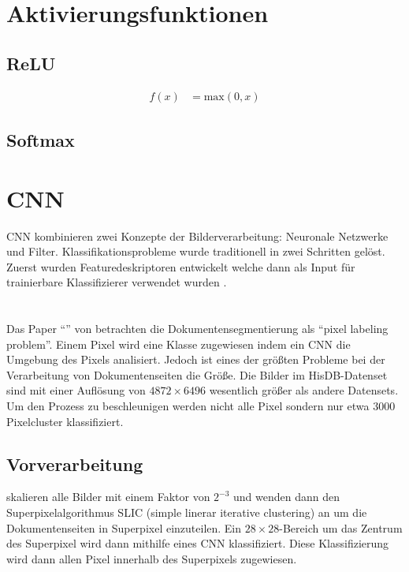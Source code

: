 \section{Aktivierungsfunktionen}
\subsection{ReLU}
\begin{align}
    f\left(x\right) &= \text{max}(0,x)
\end{align}
\subsection{Softmax}


\section{CNN}
CNN kombinieren zwei Konzepte der Bilderverarbeitung: Neuronale Netzwerke und Filter.
Klassifikationsprobleme wurde traditionell in zwei Schritten gelöst. Zuerst wurden 
Featuredeskriptoren entwickelt welche dann als Input für trainierbare Klassifizierer 
verwendet wurden \autocite[2353]{RawatDeepConvolutionalNeural2017}.

\qq{}

\section{\textcite{ChenConvolutionalNeuralNetworks2017}}
Das Paper ``'' von \citeauthor*{ChenConvolutionalNeuralNetworks2017} betrachten die Dokumentensegmentierung 
als ``pixel labeling problem''. Einem Pixel wird eine Klasse zugewiesen indem
ein CNN die Umgebung des Pixels analisiert. 
Jedoch ist eines der größten Probleme bei der Verarbeitung von Dokumentenseiten die Größe.
Die Bilder im HisDB-Datenset sind mit einer Auflösung von \(4872 \times 6496\) wesentlich größer als andere Datensets.
Um den Prozess zu beschleunigen werden nicht alle Pixel sondern nur etwa 3000 Pixelcluster klassifiziert. 

\subsection{Vorverarbeitung}
\citeauthor{ChenConvolutionalNeuralNetworks2017} skalieren alle Bilder mit einem Faktor von  \(2^{-3}\) und wenden dann den Superpixelalgorithmus SLIC (simple linerar iterative clustering) an \parencite{AchantaSLICSuperpixels2010} um die Dokumentenseiten in Superpixel einzuteilen.
Ein \(28 \times 28\)-Bereich um das Zentrum des Superpixel wird dann mithilfe eines CNN
klassifiziert. Diese Klassifizierung wird dann allen Pixel innerhalb des Superpixels zugewiesen.


